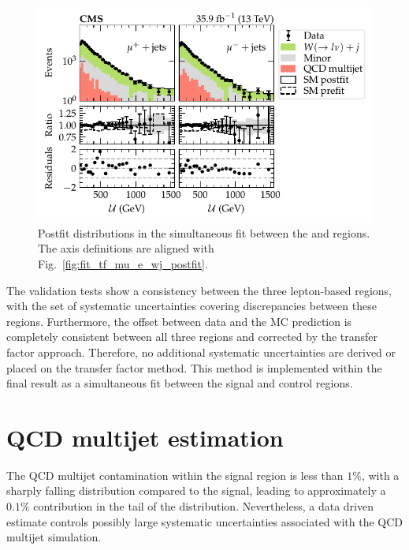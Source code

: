 %
\begin{figure}[htb]
    \centering
    \includegraphics{chapters/042_backgrounds/images/postfit_tfmup2munwj.pdf}
    \caption[Recoil distributions after a fit to the positive and negative muon control regions]{
        Postfit \recoil distributions in the simultaneous fit between the \mupplusjets and \munplusjets regions. The axis definitions are aligned with Fig.~\ref{fig:fit_tf_mu_e_wj_postfit}.
    }
    \label{fig:fit_tf_mup_mun_wj_postfit}
\end{figure}

The validation tests show a consistency between the three lepton-based regions, with the set of systematic uncertainties covering discrepancies between these regions. Furthermore, the offset between data and the MC prediction is completely consistent between all three regions and corrected by the transfer factor approach. Therefore, no additional systematic uncertainties are derived or placed on the \IWj transfer factor method. This method is implemented within the final result as a simultaneous fit between the signal and control regions.


\section{QCD multijet estimation}

The QCD multijet contamination within the \metplusjets signal region is less than $1\%$, with a sharply falling \recoil distribution compared to the signal, leading to approximately a $0.1\%$ contribution in the tail of the \recoil distribution. Nevertheless, a data driven estimate controls possibly large systematic uncertainties associated with the QCD multijet simulation.

